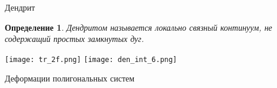 \documentclass[aspectratio=1610, 10pt, notheorems]{beamer}
\newtheorem{theorem}     {Теорема}
\newtheorem{definition}  {Определение}
\begin{document}
\begin{frame}{Дендрит}
\begin{definition} 
Дендритом называется локально связный континуум, не содержащий простых замкнутых дуг.
\end{definition}

\texttt{[image: tr\_2f.png]}
\hfill
\texttt{[image: den\_int\_6.png]}

\end{frame}


%
%
%
%
%


\begin{frame}{}
\Huge{Деформации полигональных систем}
\end{frame}
\end{document}
